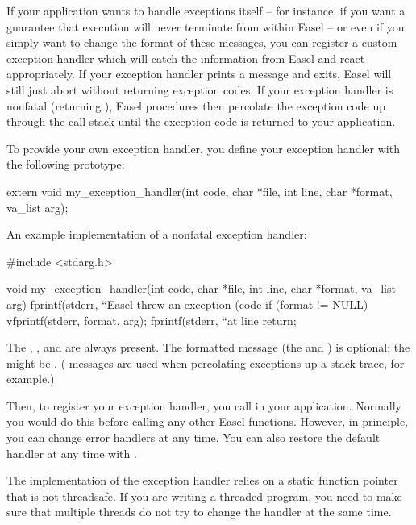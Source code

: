 If your application wants to handle exceptions itself -- for instance,
if you want a guarantee that execution will never terminate from
within Easel -- or even if you simply want to change the format of
these messages, you can register a custom exception handler which will
catch the information from Easel and react appropriately. If your
exception handler prints a message and exits, Easel will still just
abort without returning exception codes. If your exception handler is
nonfatal (returning ), Easel procedures then percolate the
exception code up through the call stack until the exception code is
returned to your application.

To provide your own exception handler, you define your exception
handler with the following prototype:

\begin{cchunk}
extern void my_exception_handler(int code, char *file, int line, char *format, va_list arg);
\end{cchunk}

An example implementation of a nonfatal exception handler:

\begin{cchunk}
#include <stdarg.h>

void
my_exception_handler(int code, char *file, int line, char *format, va_list arg)
{
  fprintf(stderr, ``Easel threw an exception (code %
  if (format != NULL) vfprintf(stderr, format, arg);
  fprintf(stderr, ``at line %
  return;
}
\end{cchunk}

The , , and  are always
present. The formatted message (the  and ) is optional; the  might be
. ( messages are used when percolating
exceptions up a stack trace, for example.)

Then, to register your exception handler, you call
 in your
application. Normally you would do this before calling any other Easel
functions. However, in principle, you can change error handlers at any
time. You can also restore the default handler at any time with
.

The implementation of the exception handler relies on a static
function pointer that is not threadsafe. If you are writing a threaded
program, you need to make sure that multiple threads do not try to
change the handler at the same time.

